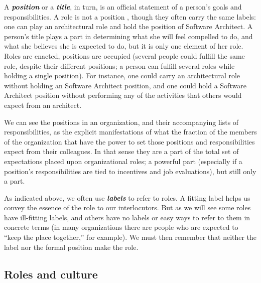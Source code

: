 \documentclass[10pt, conference, compsocconf]{IEEEtran}
\begin{document}
A \textbf{\emph{position}} or a \textbf{\emph{title}}, in turn, is an official statement of a person's goals and responsibilities. A role is not a position \cite{Turner1956}, though they often carry the same labels: one can play an architectural role and hold the position of Software Architect. A person's title plays a part in determining what she will feel compelled to do, and what she believes she is expected to do, but it is only one element of her role. Roles are enacted, positions are occupied (several people could fulfill the same role, despite their different positions; a person can fulfill several roles while holding a single position). For instance, one could carry an architectural role without holding an Software Architect position, and one could hold a Software Architect position without performing any of the activities that others would expect from an architect.

We can see the positions in an organization, and their accompanying lists of responsibilities, as the explicit manifestations of what the fraction of the members of the organization that have the power to set those positions and responsibilities expect from their colleagues. In that sense they are a part of the total set of expectations placed upon organizational roles; a powerful part (especially if a position's responsibilities are tied to incentives and job evaluations), but still only a part.

As indicated above, we often use \textbf{\emph{labels}} to refer to roles. A fitting label helps us convey the essence of the role to our interlocutors. But as we will see some roles have ill-fitting labels, and others have no labels or easy ways to refer to them in concrete terms (in many organizations there are people who are expected to ``keep the place together,'' for example). We must then remember that neither the label nor the formal position make the role. 


\subsection{Roles and culture}
\end{document}
